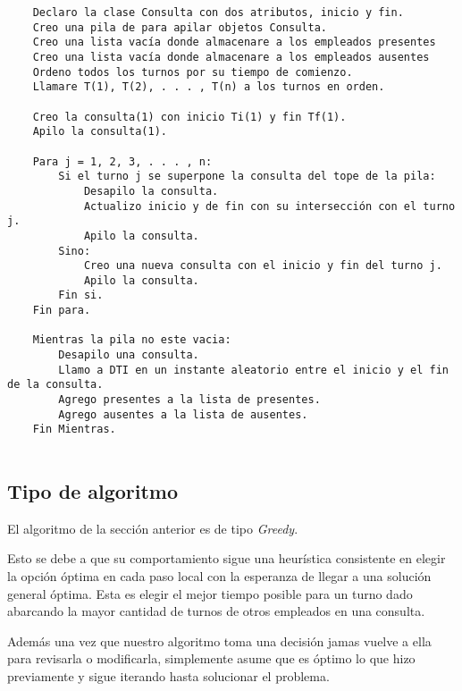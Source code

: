 \begin{verbatim}
    Declaro la clase Consulta con dos atributos, inicio y fin.
    Creo una pila de para apilar objetos Consulta.
    Creo una lista vacía donde almacenare a los empleados presentes
    Creo una lista vacía donde almacenare a los empleados ausentes
    Ordeno todos los turnos por su tiempo de comienzo.
    Llamare T(1), T(2), . . . , T(n) a los turnos en orden.
    
    Creo la consulta(1) con inicio Ti(1) y fin Tf(1).
    Apilo la consulta(1).
    
    Para j = 1, 2, 3, . . . , n:
        Si el turno j se superpone la consulta del tope de la pila:
            Desapilo la consulta.
            Actualizo inicio y de fin con su intersección con el turno j.
            Apilo la consulta.
        Sino:
            Creo una nueva consulta con el inicio y fin del turno j.
            Apilo la consulta.
        Fin si.
    Fin para.
    
    Mientras la pila no este vacia:
        Desapilo una consulta.
        Llamo a DTI en un instante aleatorio entre el inicio y el fin de la consulta.
        Agrego presentes a la lista de presentes.
        Agrego ausentes a la lista de ausentes.
    Fin Mientras.
    
\end{verbatim}
\newpage

\subsection{Tipo de algoritmo}
El algoritmo de la sección anterior es de tipo \emph{Greedy}. \newline

Esto se debe a que su comportamiento sigue una heurística consistente en elegir la opción óptima en cada paso local con la esperanza de llegar a una solución general óptima. Esta es elegir el mejor tiempo posible para un turno dado abarcando la mayor cantidad de turnos de otros empleados en una consulta. \newline

Además una vez que nuestro algoritmo toma una decisión jamas vuelve a ella para revisarla o modificarla, simplemente asume que es óptimo lo que hizo previamente y sigue iterando hasta solucionar el problema.\newline \newpage

